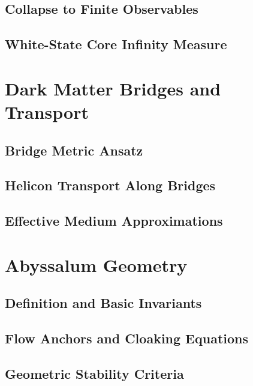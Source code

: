 \subsection{Collapse to Finite Observables}

\subsection{White-State Core Infinity Measure}

\section{Dark Matter Bridges and Transport}
\label{app:bridges}

\subsection{Bridge Metric Ansatz}

\subsection{Helicon Transport Along Bridges}

\subsection{Effective Medium Approximations}

\section{Abyssalum Geometry}
\label{app:abyssalum}

\subsection{Definition and Basic Invariants}

\subsection{Flow Anchors and Cloaking Equations}

\subsection{Geometric Stability Criteria}

